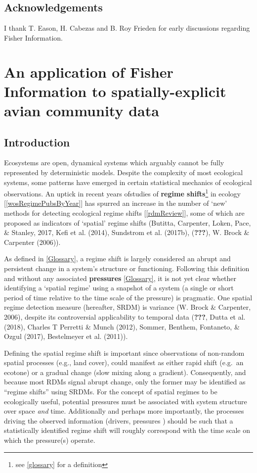 \documentclass[12pt,twoside,openany]{reedthesis}
\begin{document}
\section{Acknowledgements}\label{acknowledgements}

I thank T. Eason, H. Cabezas and B. Roy Frieden for early discussions
regarding Fisher Information.

\chapter{An application of Fisher Information to spatially-explicit
avian community data}\label{fisherSpatial}

\section{Introduction}\label{introduction-2}

Ecosystems are open, dynamical systems which arguably cannot be fully
represented by deterministic models. Despite the complexity of most
ecological systems, some patterns have emerged in certain statistical
mechanics of ecological observations. An uptick in recent years
ofstudies of \textbf{regime shifts}\footnote{see \ref{glossary} for a
  definition} in ecology {[}\ref{wosRegimePubsByYear}{]} has spurred an
increase in the number of `new' methods for detecting ecological regime
shifts {[}\ref{rdmReview}{]}, some of which are proposed as indicators
of `spatial' regime shifts (Butitta, Carpenter, Loken, Pace, \& Stanley,
2017, Kefi et al. (2014), Sundstrom et al. (2017b), ({\textbf{???}}), W.
Brock \& Carpenter (2006)).

As defined in \ref{Glossary}, a regime shift is largely considered an
abrupt and persistent change in a system's structure or functioning.
Following this definition and without any associated \textbf{pressures}
\ref{Glossary}, it is not yet clear whether identifying a `spatial
regime' using a snapshot of a system (a single or short period of time
relative to the time scale of the pressure) is pragmatic. One spatial
regime detection measure (hereafter, SRDM) is variance (W. Brock \&
Carpenter, 2006), despite its controversial applicability to temporal
data ({\textbf{???}}, Dutta et al. (2018), Charles T Perretti \& Munch
(2012), Sommer, Benthem, Fontaneto, \& Ozgul (2017), Bestelmeyer et al.
(2011)).

Defining the spatial regime shift is important since observations of
non-random spatial processes (e.g., land cover), could manifest as
either rapid shift (e.g.~an ecotone) or a gradual change (slow mixing
along a gradient). Consequently, and because most RDMs signal abrupt
change, only the former may be identified as ``regime shifts'' using
SRDMs. For the concept of spatial regimes to be ecologically useful,
potential pressures must be associated with system structure over space
\emph{and} time. Additionally and perhaps more importantly, the
processes driving the observed information (drivers, pressures ) should
be such that a statistically identified regime shift will roughly
correspond with the time scale on which the pressure(s) operate.
\end{document}
